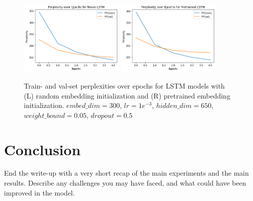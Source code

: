 \documentclass[11pt]{article}
\begin{document}
\begin{figure}
  \centering
  \includegraphics[width=0.45\textwidth]{figures/lstm_naive_pp.png}
  \includegraphics[width=0.45\textwidth]{figures/lstm_pretrained_pp.png}
  \caption{Train- and val-set perplexities over epochs for LSTM models with (L) random embedding initialization and (R) pretrained embedding initialization. $embed\_dim=300$, $lr=1e^{-3}$, $hidden\_dim=650$, $weight\_bound=0.05$, $dropout=0.5$}
  \label{fig:lstm-pps}
\end{figure}

\section{Conclusion}

End the write-up with a very short recap of the main experiments and the main results. Describe any challenges you may have faced, and what could have been improved in the model.



\end{document}
